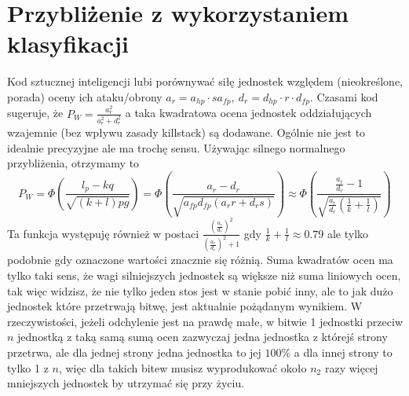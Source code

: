 \documentclass{article}
\begin{document}
\section{Przybliżenie z wykorzystaniem klasyfikacji}
Kod sztucznej inteligencji lubi porównywać siłę jednostek względem (nieokreślone, porada) oceny ich ataku/obrony $a_{r} = a_{hp} \cdot s a_{fp},\: d_{r} = d_{hp} \cdot r \cdot d_{fp}$. Czasami kod sugeruje, że $P_{W}=\frac{a^2_r}{a^2_r+d^2_r}$ a taka kwadratowa ocena jednostek oddziałujących wzajemnie (bez wpływu zasady killstack) są dodawane. Ogólnie nie jest to idealnie precyzyjne ale ma trochę sensu. Używając silnego normalnego przybliżenia, otrzymamy to
\begin{equation*}
    P_{W}=\Phi\left(\frac{l_p-kq}{\sqrt{\left(k+l\right)pg}} \right)=
    \Phi\left(\frac{a_r-d_r}{\sqrt{a_{fp}d_{fp}\left(a_rr+d_rs\right)}}\right)\approx
    \Phi\left( \frac{\frac{a_r}{d_r}-1}{\sqrt{\frac{a_r}{d_r}\left(
    \frac{1}{k}+\frac{1}{l}
    \right)}
    }\right)
\end{equation*}
Ta funkcja występuję również w postaci $\frac{
\left( \frac{a_r}{d_r} \right)^2
}{\left( \frac{a_r}{d_r} \right)^2 +1}$
gdy $\frac{1}{k}+\frac{1}{l} \approx 0.79$ ale tylko podobnie gdy oznaczone wartości znacznie się różnią.
Suma kwadratów ocen ma tylko taki sens, że wagi silniejszych jednostek są większe niż suma liniowych ocen, tak więc widzisz, że nie tylko jeden stos jest w stanie pobić inny, ale to jak dużo jednostek które przetrwają bitwę, jest aktualnie pożądanym wynikiem. W rzeczywistości, jeżeli odchylenie jest na prawdę małe, w bitwie 1 jednostki przeciw $n$ jednostką z taką samą sumą ocen zazwyczaj jedna jednostka z którejś strony przetrwa, ale dla jednej strony jedna jednostka to jej $100\%$ a dla innej strony to tylko 1 z $n$, więc dla takich bitew musisz wyprodukować około $n_2$ razy więcej mniejszych jednostek by utrzymać się przy życiu.
\end{document}
